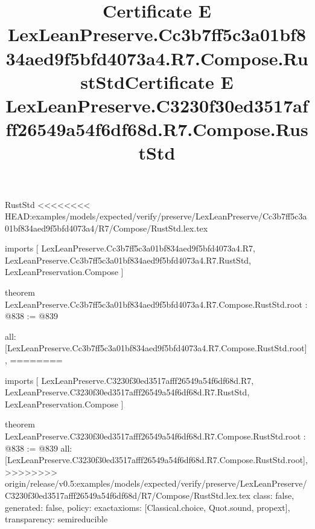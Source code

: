 \begin{lexlean}{RustStd}
<<<<<<<< HEAD:examples/models/expected/verify/preserve/LexLeanPreserve/Cc3b7ff5c3a01bf834aed9f5bfd4073a4/R7/Compose/RustStd.lex.tex
\title{Certificate E LexLeanPreserve.Cc3b7ff5c3a01bf834aed9f5bfd4073a4.R7.Compose.RustStd}
\begin{coremodule}
imports [
  LexLeanPreserve.Cc3b7ff5c3a01bf834aed9f5bfd4073a4.R7,
  LexLeanPreserve.Cc3b7ff5c3a01bf834aed9f5bfd4073a4.R7.RustStd,
  LexLeanPreservation.Compose
]

theorem LexLeanPreserve.Cc3b7ff5c3a01bf834aed9f5bfd4073a4.R7.Compose.RustStd.root : @838 := @839 {
  all: [LexLeanPreserve.Cc3b7ff5c3a01bf834aed9f5bfd4073a4.R7.Compose.RustStd.root],
========
\title{Certificate E LexLeanPreserve.C3230f30ed3517afff26549a54f6df68d.R7.Compose.RustStd}
\begin{coremodule}
imports [
  LexLeanPreserve.C3230f30ed3517afff26549a54f6df68d.R7,
  LexLeanPreserve.C3230f30ed3517afff26549a54f6df68d.R7.RustStd,
  LexLeanPreservation.Compose
]

theorem LexLeanPreserve.C3230f30ed3517afff26549a54f6df68d.R7.Compose.RustStd.root : @838 := @839 {
  all: [LexLeanPreserve.C3230f30ed3517afff26549a54f6df68d.R7.Compose.RustStd.root],
>>>>>>>> origin/release/v0.5:examples/models/expected/verify/preserve/LexLeanPreserve/C3230f30ed3517afff26549a54f6df68d/R7/Compose/RustStd.lex.tex
  class: false,
  generated: false,
  policy: exact{axioms: [Classical.choice, Quot.sound, propext]},
  transparency: semireducible
}


\end{coremodule}}
\end{coremodule}
\end{lexlean}
